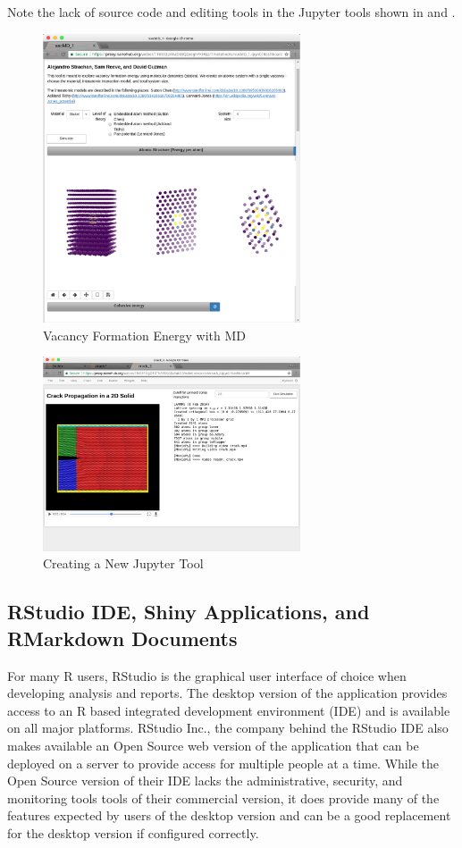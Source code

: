 \documentclass[conference]{../sty/IEEEtran}
\begin{document}
Note the lack of source code and editing tools in the Jupyter tools shown in  and .

\begin{figure}[!h]
	\includegraphics[width=3in]{mdvacancy}
	\caption{Vacancy Formation Energy with MD \cite{mdvacancy}}
	\label{fig_mdvacancy}
\end{figure}

\begin{figure}[!h]
	\includegraphics[width=3in]{crack}
	\caption{Creating a New Jupyter Tool}
	\label{fig_crack}
\end{figure}


\subsection {RStudio IDE, Shiny Applications, and RMarkdown Documents}

For many R users, RStudio is the graphical user interface of choice when
developing analysis and reports. The desktop version of the application
provides access to an R based integrated development environment (IDE) and is
available on all major platforms. RStudio Inc., the company behind the RStudio
IDE also makes available an Open Source web version of the application that can
be deployed on a server to provide access for multiple people at a time. While
the Open Source version of their IDE lacks the administrative, security, and
monitoring tools tools of their commercial version, it does provide many of the
features expected by users of the desktop version and can be a good replacement
for the desktop version if configured correctly.
\end{document}
